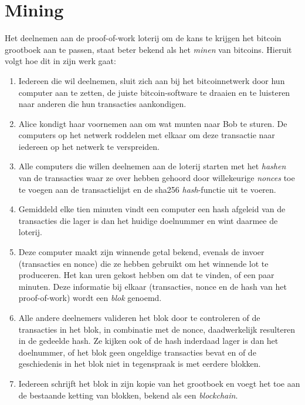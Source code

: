 
\chapter{Mining}

Het deelnemen aan de proof-of-work loterij om de kans te krijgen het bitcoin grootboek aan te passen, staat beter bekend als het \textit{minen} van bitcoins. Hieruit volgt hoe dit in zijn werk gaat:

\begin{enumerate}
    \item Iedereen die wil deelnemen, sluit zich aan bij het bitcoinnetwerk door hun computer aan te zetten, de juiste bitcoin-software te draaien en te luisteren naar anderen die hun transacties aankondigen.
    \item Alice kondigt haar voornemen aan om wat munten naar Bob te sturen. De computers op het netwerk \textquotedbl{}roddelen\textquotedbl{} met elkaar om deze transactie naar iedereen op het netwerk te verspreiden.
    \item Alle computers die willen deelnemen aan de loterij starten met het \textit{hashen} van de transacties waar ze over hebben gehoord door willekeurige \textit{nonces} toe te voegen aan de transactielijst en de sha256 \textit{hash}-functie uit te voeren.
    \item Gemiddeld elke tien minuten vindt een computer een hash afgeleid van de transacties die lager is dan het huidige doelnummer en wint daarmee de loterij.
    \item Deze computer maakt zijn winnende getal bekend, evenals de invoer (transacties en nonce) die ze hebben gebruikt om het winnende lot te produceren. Het kan uren gekost hebben om dat te vinden, of een paar minuten. Deze informatie bij elkaar (transacties, nonce en de hash van het proof-of-work) wordt een \textit{blok} genoemd.
    \item Alle andere deelnemers valideren het blok door te controleren of de transacties in het blok, in combinatie met de nonce, daadwerkelijk resulteren in de gedeelde hash. Ze kijken ook of de hash inderdaad lager is dan het doelnummer, of het blok geen ongeldige transacties bevat en of de geschiedenis in het blok niet in tegenspraak is met eerdere blokken.
    \item Iedereen schrijft het blok in zijn kopie van het grootboek en voegt het toe aan de bestaande ketting van blokken, bekend als een \textit{blockchain}.
\end{enumerate}

